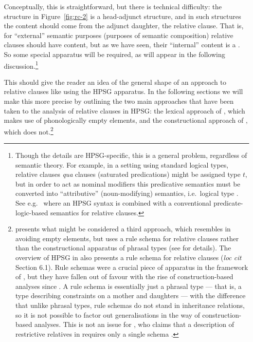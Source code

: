 \documentclass[output=paper
 	        ,biblatex
                ,babelshorthands
                ,newtxmath
                ,draftmode
                ,colorlinks, citecolor=brown
]{langscibook}
\begin{document}
Conceptually, this is straightforward, but there is technical difficulty: the structure in
Figure~\ref{fig:rc-2} is a head-adjunct structure, and in such structures the content should
come from the adjunct daughter, the relative clause. That is, for ``external'' semantic
purposes (purposes of semantic composition) relative clauses should have
 content, but as we have seen, their ``internal'' content is a
. So some special apparatus will be required, as will appear in the following
discussion.\footnote{Though the details are HPSG-specific, this is a general problem,
  regardless of semantic theory. For example, in a setting using standard logical types,
  relative clauses \emph{qua} clauses (saturated predications) might be assigned type $t$,
  but in order to act as nominal modifiers this predicative semantics must be converted
  into ``attributive'' (noun-modifying) semantics, i.e.\  logical type
  . See e.g.\ \cite[521--524]{Sag:10b} where an HPSG syntax is combined with a conventional
  predicate-logic-based semantics for relative clauses. }

This should give the reader an idea of the general shape of an approach to relative
clauses like  using the HPSG apparatus. In the following sections we will make this
more precise by outlining the two main approaches that have been taken to the analysis of
relative clauses in HPSG: the lexical approach of \cite[Chapter~5]{Pollard:Sag:94}, which
makes use of phonologically empty elements, and the constructional approach of
\cite{Sag:97}, which does not.\footnote{\cite{Mueller99b} presents what might be
  considered a third approach, which resembles \cite{Sag:97} in avoiding empty elements,
  but uses a rule schema for  relative clauses rather than the constructional apparatus
  of phrasal types (see \citealt[95]{Mueller99b} for details). The overview of HPSG in
  \cite{MuellerCurrentApproaches} also presents a rule schema for relative clauses
  (\emph{loc cit} Section 6.1). Rule schemas were a crucial piece of apparatus in the framework of
  \cite{Pollard:Sag:94}, but they have fallen out of favour with the rise of construction-based 
  analyses since \cite{Sag:97}. A rule schema is essentially just a phrasal type ---
  that is, a type describing constraints on a mother and daughters --- with the difference
  that unlike phrasal types, rule schemas do not stand in inheritance relations, so it is
  not possible to factor out generalisations in the way of construction-based
  analyses. This is not an issue for \citeauthor{Mueller99b}, who claims that a
  description of restrictive relatives in  requires only a single schema
  \citep[74]{Mueller99b}.}
\end{document}
